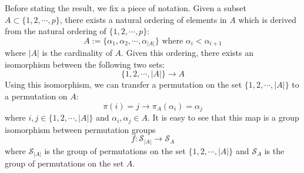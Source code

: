 \documentclass[a4paper,11pt]{article}
\theoremstyle{definition}
\numberwithin{equation}{section}
\begin{document}
Before stating the result, we fix a piece of notation. Given a subset $A\subset\{1,2,\cdots,p\}$, there exists a natural ordering of elements in $A$ which is derived from the natural ordering of $\{1,2,\cdots,p\}$:
\begin{equation}
    A := \{\alpha_1,\alpha_2,\cdots,\alpha_{|A|}\}
    \text{ where } \alpha_i < \alpha_{i+1}
\end{equation}
where $|A|$ is the cardinality of $A$. Given this ordering, there exists an isomorphism between the following two sets:
\begin{equation}
    \{1,2,\cdots,|A|\}\rightarrow A
\end{equation}
Using this isomorphism, we can transfer a permutation on the set $\{1,2,\cdots,|A|\}$ to a permutation on $A$:
\begin{equation}
    \pi(i) = j \rightarrow \pi_A(\alpha_i) = \alpha_j
\end{equation}
where $i,j\in \{1,2,\cdots,|A|\}$ and $\alpha_i, \alpha_j\in A$. It is easy to see that this map is a group isomorphism between permutation groups
\begin{equation}
    f:\mathcal{S}_{|A|}\rightarrow\mathcal{S}_A
\end{equation}
where $\mathcal{S}_{|A|}$ is the group of permutations on the set $\{1,2,\cdots,|A|\}$ and $\mathcal{S}_A$ is the group of permutations on the set $A$.
\end{document}
